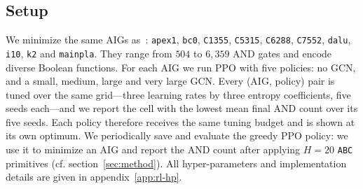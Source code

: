 \documentclass{article}
\begin{document}
\subsection{Setup}
We minimize the same AIGs as~\citet{rl-gnn1}: \texttt{apex1}, \texttt{bc0},
\texttt{C1355}, \texttt{C5315}, \texttt{C6288}, \texttt{C7552}, \texttt{dalu},
\texttt{i10}, \texttt{k2} and \texttt{mainpla}. They range from $504$ to $6{,}359$
AND gates and encode diverse Boolean functions. For each AIG we run PPO with
five policies: no GCN, and a small, medium, large and very large GCN. Every
(AIG, policy) pair is tuned over the same grid---three learning rates by three
entropy coefficients, five seeds each---and we report the cell with the lowest
mean final AND count over its five seeds. Each policy therefore receives the same tuning budget and is shown
at its own optimum. We periodically save and evaluate the greedy PPO policy: we
use it to minimize an AIG and report the AND count after applying $H=20$
\texttt{ABC} primitives (cf. section~\ref{sec:method}). All hyper-parameters and
implementation details are given in appendix~\ref{app:rl-hp}.

\begin{table}[t]
  \centering\small
  \caption{Mean AND count after $H=20$ \texttt{ABC} primitives, over the five
  seeds of each configuration's best hyper-parameter cell, $\pm$ one standard
  deviation across those seeds. \emph{Starting nodes} is the AND count of the benchmark
  before any primitive is applied; \texttt{resyn2} is deterministic and has no
  spread. AIGs are ordered by input size.}
  \label{tab:rl-ands}
  
\end{table}
\end{document}
